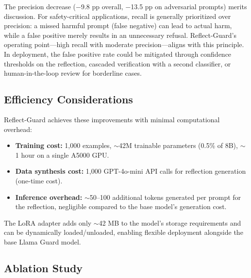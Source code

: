 \documentclass[ai,article,submit,pdftex,moreauthors]{Definitions/mdpi}
\begin{document}
The precision decrease ($-$9.8 pp overall, $-$13.5 pp on adversarial prompts) merits discussion. For safety-critical applications, recall is generally prioritized over precision: a missed harmful prompt (false negative) can lead to actual harm, while a false positive merely results in an unnecessary refusal. Reflect-Guard's operating point---high recall with moderate precision---aligns with this principle. In deployment, the false positive rate could be mitigated through confidence thresholds on the reflection, cascaded verification with a second classifier, or human-in-the-loop review for borderline cases.

\subsection{Efficiency Considerations}

Reflect-Guard achieves these improvements with minimal computational overhead:
\begin{itemize}[leftmargin=*, nosep]
  \item \textbf{Training cost:} 1{,}000 examples, $\sim$42M trainable parameters (0.5\% of 8B), $\sim$1 hour on a single A5000 GPU.
  \item \textbf{Data synthesis cost:} 1{,}000 GPT-4o-mini API calls for reflection generation (one-time cost).
  \item \textbf{Inference overhead:} $\sim$50--100 additional tokens generated per prompt for the reflection, negligible compared to the base model's generation cost.
\end{itemize}

The LoRA adapter adds only $\sim$42 MB to the model's storage requirements and can be dynamically loaded/unloaded, enabling flexible deployment alongside the base Llama Guard model.

\subsection{Ablation Study}
\label{sec:ablation}
\end{document}
